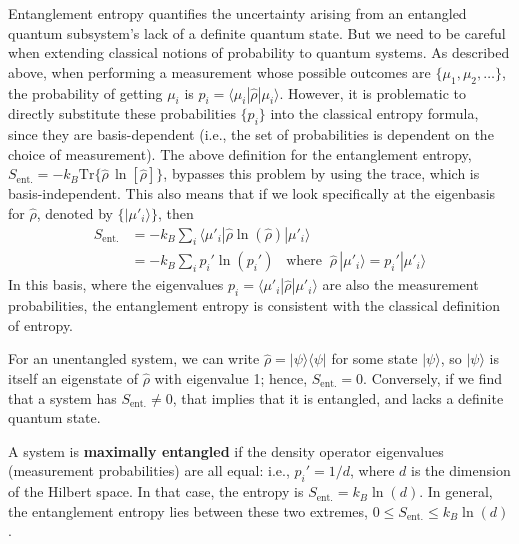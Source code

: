 \documentclass[pra,12pt]{revtex4}
\begin{document}
Entanglement entropy quantifies the uncertainty arising from an
entangled quantum subsystem's lack of a definite quantum state.  But
we need to be careful when extending classical notions of probability
to quantum systems.  As described above, when performing a measurement
whose possible outcomes are $\{\mu_1, \mu_2, \dots\}$, the probability
of getting $\mu_i$ is $p_i = \langle \mu_i | \hat{\rho}|\mu_i\rangle$.
However, it is problematic to directly substitute these probabilities
$\{p_i\}$ into the classical entropy formula, since they are
basis-dependent (i.e., the set of probabilities is dependent on the
choice of measurement).  The above definition for the entanglement
entropy, $S_{\mathrm{ent.}} = - k_B \mathrm{Tr} \big\{ \hat{\rho}\,
\ln[\hat{\rho}] \big\}$, bypasses this problem by using the trace,
which is basis-independent.  This also means that if we look
specifically at the eigenbasis for $\hat{\rho}$, denoted by
$\{|\mu'_i\rangle\}$, then
$$\begin{aligned}S_{\mathrm{ent.}} &= -k_B \sum_i \langle \mu'_i | \hat{\rho}\ln(\hat{\rho}) | \mu'_i\rangle  \\ &= - k_B \sum_i p_i' \ln(p_i') \;\;\;\mathrm{where}\;\;\hat{\rho}\,|\mu'_i\rangle = p_i' |\mu'_i\rangle\end{aligned}$$
In this basis, where the eigenvalues $p_i =
\langle\mu'_i|\hat{\rho}|\mu'_i\rangle$ are also the measurement
probabilities, the entanglement entropy is consistent with the
classical definition of entropy.

For an unentangled system, we can write $\hat{\rho} =
|\psi\rangle\langle\psi|$ for some state $|\psi\rangle$, so
$|\psi\rangle$ is itself an eigenstate of $\hat{\rho}$ with eigenvalue
1; hence, $S_{\mathrm{ent.}} = 0$.  Conversely, if we find that a
system has $S_{\mathrm{ent.}} \ne 0$, that implies that it is
entangled, and lacks a definite quantum state.

A system is \textbf{maximally entangled} if the density operator
eigenvalues (measurement probabilities) are all equal: i.e., $p_i' =
1/d$, where $d$ is the dimension of the Hilbert space.  In that case,
the entropy is $S_{\mathrm{ent.}} = k_B \ln(d)$.  In general, the
entanglement entropy lies between these two extremes, $0 \le
S_{\mathrm{ent.}} \le k_B\ln(d)$.
\end{document}
